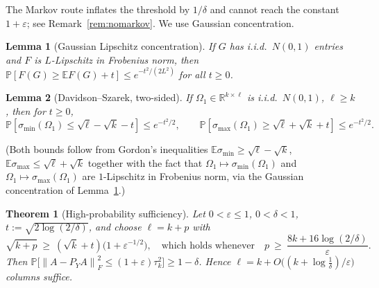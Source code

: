 \documentclass{amsart}
\newtheorem{theorem}{Theorem}
\newtheorem{lemma}{Lemma}
\theoremstyle{definition}
\newcommand{\R}{\mathbb{R}}
\newcommand{\Frob}[1]{\left\lVert #1\right\rVert_F}
\newcommand{\E}{\mathbb{E}}
\newcommand{\Prob}{\mathbb{P}}
\begin{document}
The Markov route inflates the threshold by $1/\delta$ and cannot reach the
constant $1+\varepsilon$; see Remark~\ref{rem:nomarkov}. We use Gaussian
concentration.

\begin{lemma}[Gaussian Lipschitz concentration]\label{lem:lip}
If $G$ has i.i.d.\ $N(0,1)$ entries and $F$ is $L$-Lipschitz in Frobenius norm,
then $\Prob[F(G)\ge\E F(G)+t]\le e^{-t^2/(2L^2)}$ for all $t\ge0$.
\end{lemma}

\begin{lemma}[Davidson--Szarek, two-sided]\label{lem:smin}
If $\Omega_1\in\R^{k\times\ell}$ is i.i.d.\ $N(0,1)$, $\ell\ge k$, then for
$t\ge0$,
\[
\Prob[\sigma_{\min}(\Omega_1)\le\sqrt\ell-\sqrt k-t]\le e^{-t^2/2},\qquad
\Prob[\sigma_{\max}(\Omega_1)\ge\sqrt\ell+\sqrt k+t]\le e^{-t^2/2}.
\]
\end{lemma}

(Both bounds follow from Gordon's inequalities
$\E\sigma_{\min}\ge\sqrt\ell-\sqrt k$, $\E\sigma_{\max}\le\sqrt\ell+\sqrt k$
together with the fact that $\Omega_1\mapsto\sigma_{\min}(\Omega_1)$ and
$\Omega_1\mapsto\sigma_{\max}(\Omega_1)$ are $1$-Lipschitz in Frobenius norm,
via the Gaussian concentration of Lemma~\ref{lem:lip}.)

\begin{theorem}[High-probability sufficiency]\label{thm:hp}
Let $0<\varepsilon\le1$, $0<\delta<1$, $t:=\sqrt{2\log(2/\delta)}$, and choose
$\ell=k+p$ with
\begin{equation}\label{eq:hpthresh}
\sqrt{k+p}\ \ge\ (\sqrt k+t)\big(1+\varepsilon^{-1/2}\big),
\quad\text{which holds whenever}\quad
p\ \ge\ \frac{8k+16\log(2/\delta)}{\varepsilon}.
\end{equation}
Then $\Prob\big[\Frob{A-P_YA}^2\le(1+\varepsilon)\tau_k^2\big]\ge1-\delta$.
Hence $\ell=k+O\big((k+\log\tfrac1\delta)/\varepsilon\big)$ columns suffice.
\end{theorem}
\end{document}
